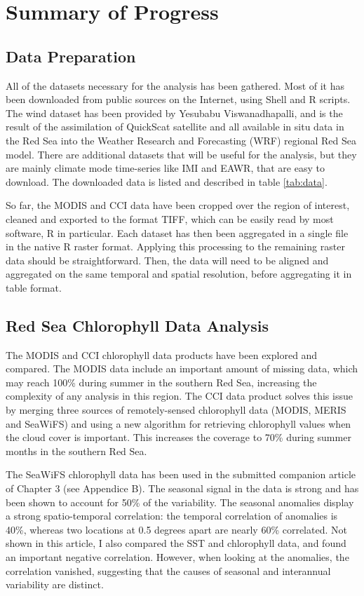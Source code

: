 \chapter{Summary of Progress}

\section{Data Preparation}

All of the datasets necessary for the analysis has been gathered. Most of
it has been downloaded from public sources on the Internet, using Shell and R
scripts. The wind dataset has been provided by Yesubabu Viswanadhapalli, and
is the result of the assimilation of QuickScat satellite and all available
in situ data in the Red Sea into
the Weather Research and Forecasting (WRF) regional Red Sea model. There are
additional datasets that will be useful for the analysis, but they are mainly
climate mode time-series like IMI and EAWR, that are easy to download. The
downloaded data is listed and described in table \ref{tab:data}.

So far, the MODIS and CCI data have been cropped over the region of interest,
cleaned and exported to the format TIFF, which can be easily read by most
software, R in particular. Each dataset has then been aggregated in a single
file in the native R raster format. Applying this processing to the remaining
raster data should be straightforward. Then, the data will need to be aligned
and aggregated on the same temporal and spatial resolution, before aggregating
it in table format.



\section{Red Sea Chlorophyll Data Analysis}

The MODIS and CCI chlorophyll data products have been explored and compared.
The MODIS data include an important amount of missing data, which may reach
100\% during summer in the southern Red Sea, increasing the complexity of any
analysis in this region. The CCI data product solves this issue by merging
three sources of remotely-sensed chlorophyll data (MODIS, MERIS and SeaWiFS)
and using a new algorithm for retrieving chlorophyll values when the cloud
cover is important.  This increases the coverage to 70\% during summer months
in the southern Red Sea.

The SeaWiFS chlorophyll data has been used in the submitted companion article
of Chapter 3 (see Appendice B).  The seasonal signal in the data is strong and
has been shown to account for 50\% of the variability. The seasonal anomalies
display a strong spatio-temporal correlation: the temporal correlation of
anomalies is 40\%, whereas two locations at 0.5 degrees apart are nearly 60\%
correlated. Not shown in this article, I also compared the SST and chlorophyll
data, and found an important negative correlation. However, when looking at the
anomalies, the correlation vanished, suggesting that the causes of seasonal and
interannual variability are distinct.


